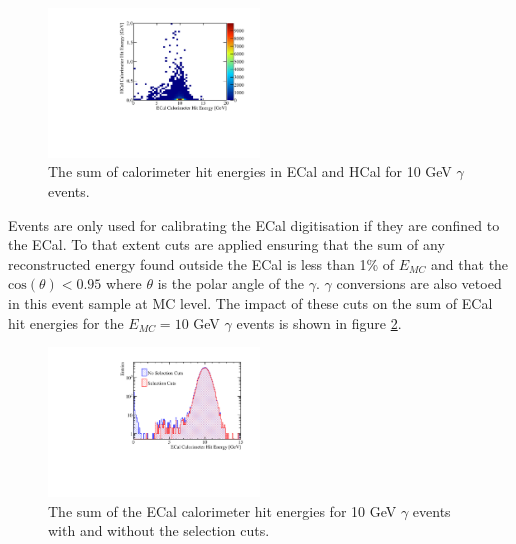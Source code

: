 \begin{figure}
\includegraphics[width=0.5\textwidth]{EnergyEstimators/Plots/Calibration/Digitsation/ECal/ECalHCalPhotonSplit.pdf}
\caption[The sum of calorimeter hit energies in ECal and HCal for 10 GeV $\gamma$ events.]{The sum of calorimeter hit energies in ECal and HCal for 10 GeV $\gamma$ events.}
\label{fig:ecaldigiphotonsplit}
\end{figure}

Events are only used for calibrating the ECal digitisation if they are confined to the ECal.  To that extent cuts are applied ensuring that the sum of any reconstructed energy found outside the ECal is less than 1\% of $E_{MC}$ and that the $\text{cos}(\theta) < 0.95$ where $\theta$ is the polar angle of the $\gamma$.  $\gamma$ conversions are also vetoed in this event sample at MC level.  The impact of these cuts on the sum of ECal hit energies for the $E_{MC} = 10$ GeV $\gamma$ events is shown in figure \ref{fig:ecaldigiselection}.

\begin{figure}
\includegraphics[width=0.5\textwidth]{EnergyEstimators/Plots/Calibration/Digitsation/ECal/DigitisationECalSelection.pdf}
\caption[The sum of the ECal calorimeter hit energies for 10 GeV $\gamma$ events with and without the selection cuts.]{The sum of the ECal calorimeter hit energies for 10 GeV $\gamma$ events with and without the selection cuts.}
\label{fig:ecaldigiselection}
\end{figure}

